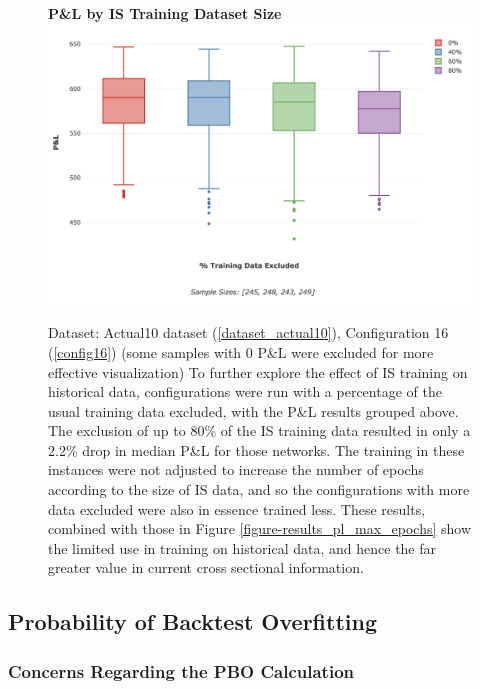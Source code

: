 \documentclass[a4paper,11pt,oneside]{article}
\theoremstyle{plain}
\theoremstyle{definition}
\begin{document}
	
	\begin{figure}[H]
		\centering 
		\textbf{P\&L by IS Training Dataset Size}
		\includegraphics[scale=0.4]{images/results/data/training_data_excluded.png}
		\caption[P\&L by IS Training Dataset Size]{
			Dataset: Actual10 dataset (\ref{dataset_actual10}), Configuration 16 (\ref{config16}) (some samples with 0 P\&L were excluded for more effective visualization)
			\newline To further explore the effect of IS training on historical data, configurations were run with a percentage of the usual training data excluded, with the P\&L results grouped above. The exclusion of up to 80\% of the IS training data resulted in only a 2.2\% drop in median P\&L for those networks. The training in these instances were not adjusted to increase the number of epochs according to the size of IS data, and so the configurations with more data excluded were also in essence trained less. These results, combined with those in Figure \ref{figure-results_pl_max_epochs} show the limited use in training on historical data, and hence the far greater value in current cross sectional information.}
		\label{figure-results_it3_validationset}
	\end{figure}
	
	
	\newpage
	
	\subsection{Probability of Backtest Overfitting}\label{results_pbo}
	
	
	\subsubsection{Concerns Regarding the PBO Calculation}\label{results_pboconcerns}
	
\end{document}
